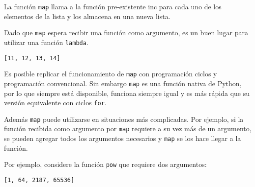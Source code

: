 La función \texttt{map} llama a la función pre-existente inc para cada
uno de los elementos de la lista y los almacena en una nueva lista.

Dado que \texttt{map} espera recibir una función como argumento, es un
buen lugar para utilizar una función \texttt{lambda}.

\begin{Shaded}
\begin{Highlighting}[]
\OperatorTok{=}\NormalTok{ [}\NormalTok{,}\NormalTok{,}\NormalTok{,}\NormalTok{]}
\NormalTok{(}\NormalTok{(}\OperatorTok{+}
\end{Highlighting}
\end{Shaded}

\begin{verbatim}
[11, 12, 13, 14]
\end{verbatim}

Es posible replicar el funcionamiento de \texttt{map} con programación
ciclos y programación convencional. Sin embargo \texttt{map} es una
función nativa de Python, por lo que siempre está disponible, funciona
siempre igual y es más rápida que su versión equivalente con ciclos
\texttt{for}.

Además \texttt{map} puede utilizarse en situaciones más complicadas. Por
ejemplo, si la función recibida como argumento por \texttt{map} requiere
a su vez más de un argumento, se pueden agregar todos los argumentos
necesarios y \texttt{map} se los hace llegar a la función.

Por ejemplo, considere la función \texttt{pow} que requiere dos
argumentos:

\begin{Shaded}
\begin{Highlighting}[]
\NormalTok{(}\NormalTok{,}\NormalTok{)}

\NormalTok{(}\NormalTok{(}\NormalTok{, [}\NormalTok{,}\NormalTok{,}\NormalTok{,}\NormalTok{], [}\NormalTok{,}\NormalTok{,}\NormalTok{,}\NormalTok{]))}
\end{Highlighting}
\end{Shaded}

\begin{verbatim}
[1, 64, 2187, 65536]
\end{verbatim}

